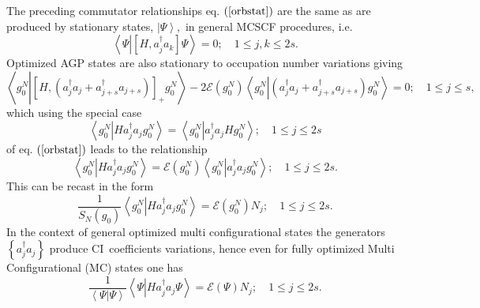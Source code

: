 \documentclass{preprint}
\begin{document}
The preceding commutator relationships eq. $\left( \ref{orbstat}\right) $
are the same as are produced by stationary states, $\left\vert \Psi
\right\rangle ,$ in general MCSCF procedures, i.e.
\begin{equation}
\left\langle \Psi\left\vert \left[ H,a_{j}^{\dagger}a_{k}\right] \Psi\right.
\right\rangle =0;\quad1\leq j,k\leq2s.
\end{equation}
Optimized AGP states are also stationary to occupation number variations
giving
\begin{equation}
\left\langle g_{0}^{N}\left\vert \left[ H,\left(
a_{j}^{\dagger}a_{j}+a_{j+s}^{\dagger}a_{j+s}\right) \right]
_{+}g_{0}^{N}\right. \right\rangle -2\mathcal{E}\left( g_{0}^{N}\right)
\left\langle g_{0}^{N}\left\vert \left(
a_{j}^{\dagger}a_{j}+a_{j+s}^{\dagger}a_{j+s}\right) g_{0}^{N}\right.
\right\rangle =0;\quad1\leq j\leq s,
\end{equation}
which using the special case
\begin{equation}
\left\langle g_{0}^{N}\left\vert Ha_{j}^{\dagger}a_{j}g_{0}^{N}\right.
\right\rangle =\left\langle g_{0}^{N}\left\vert
a_{j}^{\dagger}a_{j}Hg_{0}^{N}\right. \right\rangle ;\quad1\leq j\leq2s
\end{equation}
of eq. $\left( \ref{orbstat}\right) $ leads to the relationship
\begin{equation}
\left\langle g_{0}^{N}\left\vert Ha_{j}^{\dagger}a_{j}g_{0}^{N}\right.
\right\rangle =\mathcal{E}\left( g_{0}^{N}\right) \left\langle
g_{0}^{N}\left\vert a_{j}^{\dagger}a_{j}g_{0}^{N}\right. \right\rangle
;\quad1\leq j\leq2s.
\end{equation}
This can be recast in the form
\begin{equation}
\frac{1}{S_{N}\left( g_{0}\right) }\left\langle g_{0}^{N}\left\vert
Ha_{j}^{\dagger}a_{j}g_{0}^{N}\right. \right\rangle =\mathcal{E}\left(
g_{0}^{N}\right) N_{j};\quad1\leq j\leq2s.  \label{occnumstat}
\end{equation}
In the context of general optimized multi configurational states the
generators $\left\{ a_{j}^{\dagger}a_{j}\right\} $ produce CI\ coefficients
variations, hence even for fully optimized Multi Configurational (MC) states
one has
\begin{equation}
\frac{1}{\left\langle \left. \Psi\right\vert \Psi\right\rangle }\left\langle
\Psi\left\vert Ha_{j}^{\dagger}a_{j}\Psi\right. \right\rangle =\mathcal{E}%
\left( \Psi\right) N_{j};\quad1\leq j\leq2s.  \label{MCocc}
\end{equation}
\end{document}
